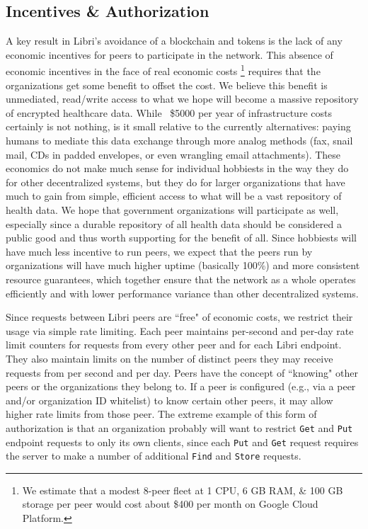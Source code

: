 \documentclass[10pt]{article}
\newcommand{\ttt}[1]{\texttt{#1}}
\begin{document}
\subsection{Incentives \& Authorization}
\label{sec:Incentives}
A key result in Libri's avoidance of a blockchain and tokens is the lack of any economic incentives for peers to participate in the network. This absence of economic incentives in the face of real economic costs \footnote{We estimate that a modest 8-peer fleet at 1 CPU, 6 GB RAM, \& 100 GB storage per peer would cost about \$400 per month on Google Cloud Platform.} requires that the organizations get some benefit to offset the cost. We believe this benefit is unmediated, read/write access to what we hope will become a massive repository of encrypted healthcare data. While ~\$5000 per year of infrastructure costs certainly is not nothing, is it small relative to the currently alternatives: paying humans to mediate this data exchange through more analog methods (fax, snail mail, CDs in padded envelopes, or even wrangling email attachments). These economics do not make much sense for individual hobbiests in the way they do for other decentralized systems, but they do for larger organizations that have much to gain from simple, efficient access to what will be a vast repository of health data. We hope that government organizations will participate as well, especially since a durable repository of all health data should be considered a public good and thus worth supporting for the benefit of all. Since hobbiests will have much less incentive to run peers, we expect that the peers run by organizations will have much higher uptime (basically 100\%) and more consistent resource guarantees, which together ensure that the network as a whole operates efficiently and with lower performance variance than other decentralized systems.

Since requests between Libri peers are ``free" of economic costs, we restrict their usage via simple rate limiting. Each peer maintains per-second and per-day rate limit counters for requests from every other peer and for each Libri endpoint. They also maintain limits on the number of distinct peers they may receive requests from per second and per day. Peers have the concept of ``knowing" other peers or the organizations they belong to. If a peer is configured (e.g., via a peer and/or organization ID whitelist) to know certain other peers, it may allow higher rate limits from those peer. The extreme example of this form of authorization is that an organization probably will want to restrict \ttt{Get} and \texttt{Put} endpoint requests to only its own clients, since each \texttt{Put} and \texttt{Get} request requires the server to make a number of additional \texttt{Find} and \texttt{Store} requests. 
\end{document}
